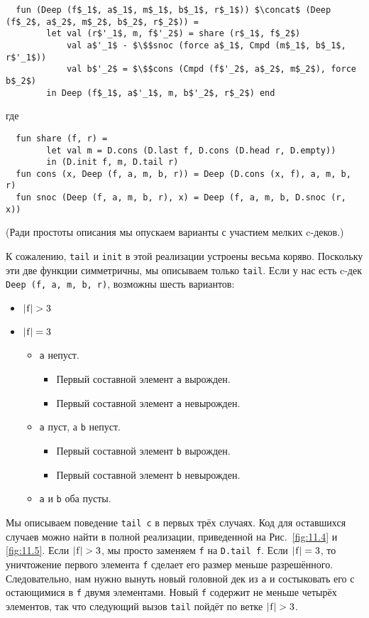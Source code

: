 \begin{lstlisting}
  fun (Deep (f$_1$, a$_1$, m$_1$, b$_1$, r$_1$)) $\concat$ (Deep (f$_2$, a$_2$, m$_2$, b$_2$, r$_2$)) =
        let val (r$'_1$, m, f$'_2$) = share (r$_1$, f$_2$)
            val a$'_1$ - $\$$snoc (force a$_1$, Cmpd (m$_1$, b$_1$, r$'_1$))
            val b$'_2$ = $\$$cons (Cmpd (f$'_2$, a$_2$, m$_2$), force b$_2$)
        in Deep (f$_1$, a$'_1$, m, b$'_2$, r$_2$) end
\end{lstlisting}
где
\begin{lstlisting}
  fun share (f, r) =
        let val m = D.cons (D.last f, D.cons (D.head r, D.empty))
        in (D.init f, m, D.tail r)
  fun cons (x, Deep (f, a, m, b, r)) = Deep (D.cons (x, f), a, m, b, r)
  fun snoc (Deep (f, a, m, b, r), x) = Deep (f, a, m, b, D.snoc (r, x))
\end{lstlisting}
(Ради простоты описания мы опускаем варианты с участием мелких
c-деков.)

К сожалению, \lstinline!tail! и \lstinline!init! в этой реализации
устроены весьма коряво. Поскольку эти две функции симметричны, мы
описываем только \lstinline!tail!. Если у нас есть c-дек
\lstinline!Deep (f, a, m, b, r)!, возможны шесть вариантов:
\begin{itemize}
\item $|\lstinline!f!| > 3$
\item $|\lstinline!f!| = 3$
  \begin{itemize}
  \item \lstinline!a! непуст.
    \begin{itemize}
    \item Первый составной элемент \lstinline!a! вырожден.
    \item Первый составной элемент \lstinline!a! невырожден.
    \end{itemize}
  \item \lstinline!a! пуст, а \lstinline!b! непуст.
    \begin{itemize}
    \item Первый составной элемент \lstinline!b! вырожден.
    \item Первый составной элемент \lstinline!b! невырожден.
    \end{itemize}
  \item \lstinline!a! и \lstinline!b! оба пусты.
  \end{itemize}
\end{itemize}
Мы описываем поведение \lstinline!tail c! в первых трёх
случаях. Код для оставшихся случаев можно найти в полной реализации,
приведенной на Рис.~\ref{fig:11.4} и \ref{fig:11.5}. Если
$|\lstinline!f!| > 3$, мы просто заменяем \lstinline!f! на
\lstinline!D.tail f!. Если $|\lstinline!f!| = 3$, то 
уничтожение первого элемента \lstinline!f! сделает его размер меньше
разрешённого. Следовательно, нам нужно вынуть новый головной дек из
\lstinline!a! и состыковать его с остающимися в \lstinline!f! двумя
элементами. Новый \lstinline!f! содержит не меньше четырёх элементов,
так что следующий вызов \lstinline!tail! пойдёт по ветке
$|\lstinline!f!| > 3$.

